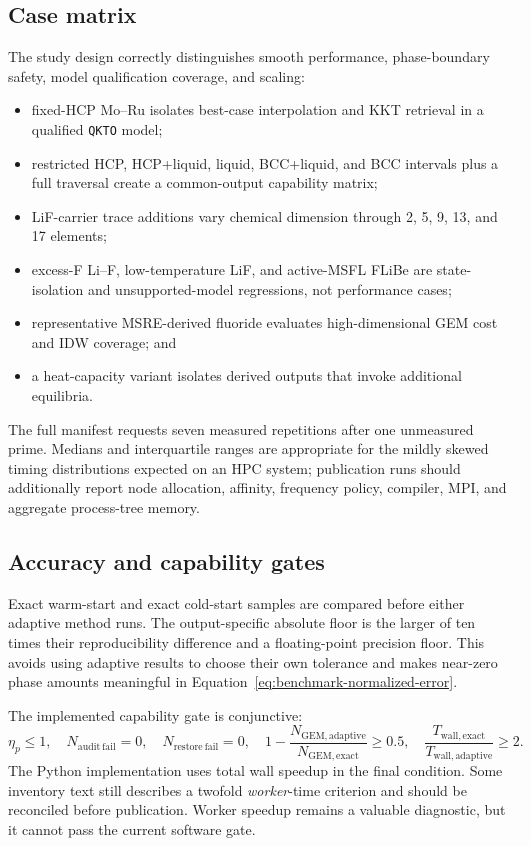 \documentclass[11pt]{article}
\newcommand{\code}[1]{\texttt{#1}}
\begin{document}
\subsection{Case matrix}

The study design correctly distinguishes smooth performance, phase-boundary safety, model
qualification coverage, and scaling:
\begin{itemize}[leftmargin=*]
  \item fixed-HCP Mo--Ru isolates best-case interpolation and KKT retrieval in a qualified
  \code{QKTO} model;
  \item restricted HCP, HCP+liquid, liquid, BCC+liquid, and BCC intervals plus a full traversal
  create a common-output capability matrix;
  \item LiF-carrier trace additions vary chemical dimension through 2, 5, 9, 13, and 17 elements;
  \item excess-F Li--F, low-temperature LiF, and active-MSFL FLiBe are state-isolation and
  unsupported-model regressions, not performance cases;
  \item representative MSRE-derived fluoride evaluates high-dimensional GEM cost and IDW coverage;
  and
  \item a heat-capacity variant isolates derived outputs that invoke additional equilibria.
\end{itemize}
The full manifest requests seven measured repetitions after one unmeasured prime.  Medians and
interquartile ranges are appropriate for the mildly skewed timing distributions expected on an HPC
system; publication runs should additionally report node allocation, affinity, frequency policy,
compiler, MPI, and aggregate process-tree memory.

\subsection{Accuracy and capability gates}

Exact warm-start and exact cold-start samples are compared before either adaptive method runs.
The output-specific absolute floor is the larger of ten times their reproducibility difference
and a floating-point precision floor.  This avoids using adaptive results to choose their own
tolerance and makes near-zero phase amounts meaningful in Equation~\eqref{eq:benchmark-normalized-error}.

The implemented capability gate is conjunctive:
\begin{equation}
  \eta_p\leq1,\quad N_{\mathrm{audit\ fail}}=0,\quad
  N_{\mathrm{restore\ fail}}=0,\quad
  1-\frac{N_{\mathrm{GEM,adaptive}}}{N_{\mathrm{GEM,exact}}}\geq0.5,\quad
  \frac{T_{\mathrm{wall,exact}}}{T_{\mathrm{wall,adaptive}}}\geq2.
  \label{eq:capability-gate}
\end{equation}
The Python implementation uses total wall speedup in the final condition.  Some inventory text
still describes a twofold \emph{worker}-time criterion and should be reconciled before publication.
Worker speedup remains a valuable diagnostic, but it cannot pass the current software gate.
\end{document}
